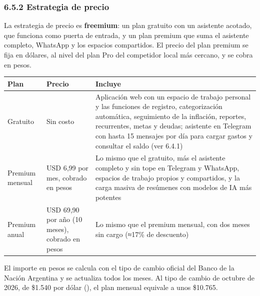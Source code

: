 \subsubsection*{6.5.2 Estrategia de precio}\label{estrategia-de-precio}

La estrategia de precio es \textbf{freemium}: un plan gratuito con un
asistente acotado, que funciona como puerta de entrada, y un plan
premium que suma el asistente completo, WhatsApp y los espacios
compartidos. El precio del plan premium se fija en dólares, al nivel del
plan Pro del competidor local más cercano, y se cobra en pesos.

{\def\LTcaptype{none} %
\begin{longtable}[]{@{}
  >{\raggedright\arraybackslash}p{}
  >{\raggedright\arraybackslash}p{}
  >{\raggedright\arraybackslash}p{}@{}}
\toprule\noalign{}
\begin{minipage}[b]{\linewidth}\raggedright
Plan
\end{minipage} & \begin{minipage}[b]{\linewidth}\raggedright
Precio
\end{minipage} & \begin{minipage}[b]{\linewidth}\raggedright
Incluye
\end{minipage} \\
\midrule\noalign{}
\endhead
\bottomrule\noalign{}
\endlastfoot
Gratuito & Sin costo & Aplicación web con un espacio de trabajo personal
y las funciones de registro, categorización automática, seguimiento de
la inflación, reportes, recurrentes, metas y deudas; asistente en
Telegram con hasta 15 mensajes por día para cargar gastos y consultar el
saldo (ver 6.4.1) \\
Premium mensual & USD 6,99 por mes, cobrado en pesos & Lo mismo que el
gratuito, más el asistente completo y sin tope en Telegram y WhatsApp,
espacios de trabajo propios y compartidos, y la carga masiva de
resúmenes con modelos de IA más potentes \\
Premium anual & USD 69,90 por año (10 meses), cobrado en pesos & Lo
mismo que el premium mensual, con dos meses sin cargo (≈17\% de
descuento) \\
\end{longtable}
}

El importe en pesos se calcula con el tipo de cambio oficial del Banco
de la Nación Argentina y se actualiza todos los meses. Al tipo de cambio
de octubre de 2026, de \$1.540 por dólar
(), el plan
mensual equivale a unos \$10.765.

